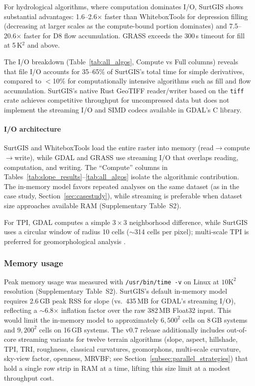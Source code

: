 \documentclass[preprint,review,12pt,authoryear]{elsarticle}
\begin{document}
For hydrological algorithms, where computation dominates I/O, SurtGIS shows substantial advantages: 1.6--2.6$\times$ faster than WhiteboxTools for depression filling (decreasing at larger scales as the compute-bound portion dominates) and 7.5--20.6$\times$ faster for D8 flow accumulation. GRASS exceeds the 300\,s timeout for fill at 5\,K$^2$ and above.

The I/O breakdown (Table~\ref{tab:all_algos}, Compute vs Full columns) reveals that file I/O accounts for 35--65\% of SurtGIS's total time for simple derivatives, compared to $<$10\% for computationally intensive algorithms such as fill and flow accumulation. SurtGIS's native Rust GeoTIFF reader/writer based on the \texttt{tiff} crate achieves competitive throughput for uncompressed data but does not implement the streaming I/O and SIMD codecs available in GDAL's C library.

\paragraph{I/O architecture} SurtGIS and WhiteboxTools load the entire raster into memory (read$\rightarrow$compute$\rightarrow$write), while GDAL and GRASS use streaming I/O that overlaps reading, computation, and writing. The ``Compute'' columns in Tables~\ref{tab:slope_results}--\ref{tab:all_algos} isolate the algorithmic contribution. The in-memory model favors repeated analyses on the same dataset (as in the case study, Section~\ref{sec:casestudy}), while streaming is preferable when dataset size approaches available RAM (Supplementary Table~S2).

For TPI, GDAL computes a simple $3 \times 3$ neighborhood difference, while SurtGIS uses a circular window of radius 10 cells ($\sim$314 cells per pixel); multi-scale TPI is preferred for geomorphological analysis \citep{dereu2013, newman2018}.

\subsubsection{Memory usage}

Peak memory usage was measured with \texttt{/usr/bin/time -v} on Linux at $10\text{K}^2$ resolution (Supplementary Table~S2). SurtGIS's default in-memory model requires 2.6\,GB peak RSS for slope (vs.\ 435\,MB for GDAL's streaming I/O), reflecting a $\sim$6.8$\times$ inflation factor over the raw 382\,MB Float32 input. This would limit the in-memory model to approximately $6{,}500^2$ cells on 8\,GB systems and $9{,}200^2$ cells on 16\,GB systems. The v0.7 release additionally includes out-of-core streaming variants for twelve terrain algorithms (slope, aspect, hillshade, TPI, TRI, roughness, classical curvatures, geomorphons, multi-scale curvature, sky-view factor, openness, MRVBF; see Section~\ref{subsec:parallel_strategies}) that hold a single row strip in RAM at a time, lifting this size limit at a modest throughput cost.
\end{document}
